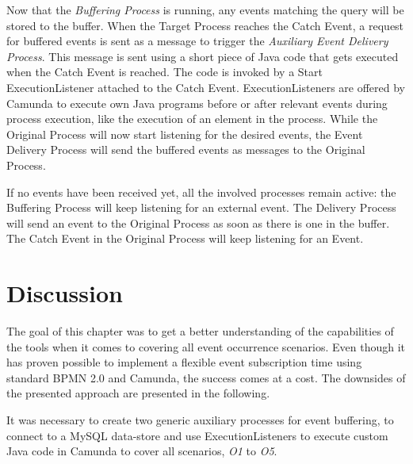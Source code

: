 Now that the \textit{Buffering Process} is running, any events matching the query will be stored to the buffer.
When the Target Process reaches the Catch Event, a request for buffered events is sent as a message to trigger the \textit{Auxiliary Event Delivery Process}.
This message is sent using a short piece of Java code that gets executed when the Catch Event is reached. 
The code is invoked by a Start ExecutionListener attached to the Catch Event. ExecutionListeners are offered by Camunda to execute own Java programs before or after relevant events during process execution, like the execution of an element in the process.
While the Original Process will now start listening for the desired events, the Event Delivery Process will send the buffered events as messages to the Original Process.

If no events have been received yet, all the involved processes remain active: the Buffering Process will keep listening for an external event. The Delivery Process will send an event to the Original Process as soon as there is one in the buffer. The Catch Event in the Original Process will keep listening for an Event.





\section{Discussion}\label{ch:ass:discussion}
The goal of this chapter was to get a better understanding of the capabilities of the tools when it comes to covering all event occurrence scenarios. 
Even though it has proven possible to implement a flexible event subscription time using standard BPMN 2.0 and Camunda, the success comes at a cost.
The downsides of the presented approach are presented in the following.

It was necessary to create two generic auxiliary processes for event buffering, to connect to a MySQL data-store and use ExecutionListeners to execute custom Java code in Camunda to cover all scenarios, \textit{O1} to \textit{O5}.

